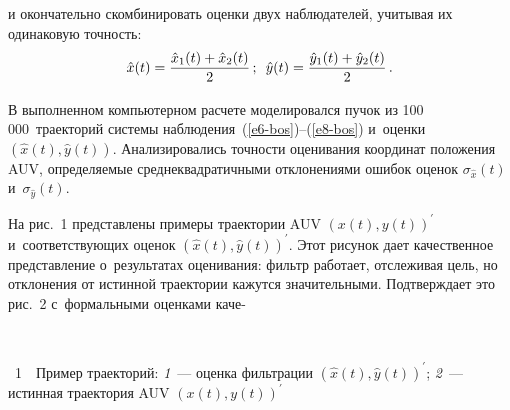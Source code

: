 \begin{multicols}{2}
     \vspace*{-1pt}
     
\noindent
     и окончательно скомбинировать оценки двух наблюдателей, учитывая 
их одинаковую точ\-ность: 
     $$
     \hat{x}(t)=\displaystyle\frac{\displaystyle \hat{x}_1(t)+\hat{x}_2(t)\mathstrut}{\displaystyle 2\mathstrut}\,;\enskip \hat{y}(t)= 
\displaystyle\frac{\displaystyle \hat{y}_1(t)+\hat{y}_2(t)\mathstrut}{\displaystyle 2\mathstrut}\,.
     $$
     
          \vspace*{-1pt}
     
     В выполненном компьютерном расчете моделировался пучок из 
100\,000~траекторий сис\-те\-мы наблюдения~(\ref{e6-bos})--(\ref{e8-bos}) 
и~оценки $\left( \hat{x}(t), \hat{y}(t)\right)$. Анализировались точности 
оценивания координат положения AUV, опре\-де\-ля\-емые 
сред\-не\-квад\-ра\-тич\-ны\-ми отклонениями ошибок оценок $\sigma_{\hat{x}}(t)$ 
и~$\sigma_{\hat{y}}(t)$.


     
     На рис.~1 представлены примеры траектории AUV $\left( x(t), 
y(t)\right)^\prime$ и~со\-от\-вет\-ст\-ву\-ющих оценок $\left( \hat{x}(t), 
\hat{y}(t)\right)^\prime$. Этот рисунок дает качественное пред\-став\-ле\-ние 
о~результатах оценивания: фильтр работает, отслеживая цель, но отклонения 
от истинной траектории кажутся значительными. Под\-тверж\-да\-ет это рис.~2 
с~формальными оценками каче-\linebreak\vspace*{-12pt}



{ \begin{center}  %
 \vspace*{6pt}
    \mbox{%
\epsfxsize=79mm 
}

\end{center}

\vspace*{-4pt}

\noindent
{{\figurename~1}\ \ \small{Пример траекторий: \textit{1}~--- оценка фильт\-ра\-ции $\left( \hat{x}(t), 
\hat{y}(t)\right)^\prime$; \textit{2}~--- истинная траектория AUV $\left( x(t), 
y(t)\right)^\prime$
}}}


\addtocounter{figure}{1}
     
{ \begin{center}  %
 \vspace*{6pt}
     \mbox{%
\epsfxsize=79mm 
}

\end{center}


}
\end{multicols}
